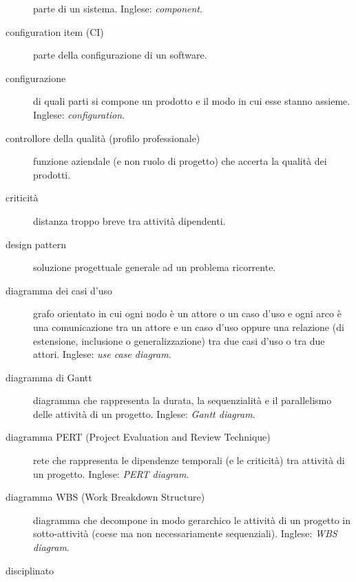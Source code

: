 \documentclass[a4paper]{article}
\begin{document}
\begin{description}
			parte di un sistema. Inglese: \emph{component}.
			
	\item[configuration item (CI)] 

			parte della configurazione di un software.
			
	\item[configurazione] 

			di quali parti si compone un prodotto e il modo in cui esse stanno assieme. Inglese: \emph{configuration}.
			
	\item[controllore della qualità (profilo professionale)] 

			funzione aziendale (e non ruolo di progetto) che accerta la qualità dei prodotti.
			
	\item[criticità] 

			distanza troppo breve tra attività dipendenti.
			
	\item[design pattern] 

			soluzione progettuale generale ad un problema ricorrente.
			
	\item[diagramma dei casi d'uso] 

			grafo orientato in cui ogni nodo è un attore o un caso d'uso e ogni arco è una comunicazione tra un attore e un caso d'uso oppure una relazione (di estensione, inclusione o generalizzazione) tra due casi d'uso o tra due attori. Inglese: \emph{use case diagram}.
			
	\item[diagramma di Gantt] 

			diagramma che rappresenta la durata, la sequenzialità e il parallelismo delle attività di un progetto. Inglese: \emph{Gantt diagram}.
			
	\item[diagramma PERT (Project Evaluation and Review Technique)] 

			rete che rappresenta le dipendenze temporali (e le criticità) tra attività di un progetto. Inglese: \emph{PERT diagram}.
			
	\item[diagramma WBS (Work Breakdown Structure)] 

			diagramma che decompone in modo gerarchico le attività di un progetto in sotto-attività (coese ma non necessariamente sequenziali). Inglese: \emph{WBS diagram}.
			
	\item[disciplinato] 


\end{description}
\end{document}
